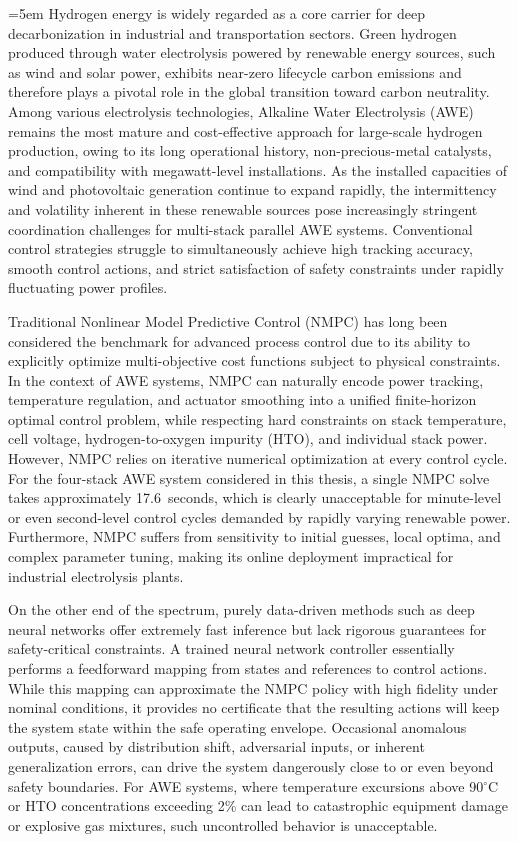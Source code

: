 
\begin{digest}[en]
\sloppy\emergencystretch=5em
Hydrogen energy is widely regarded as a core carrier for deep decarbonization in industrial and transportation sectors. Green hydrogen produced through water electrolysis powered by renewable energy sources, such as wind and solar power, exhibits near-zero lifecycle carbon emissions and therefore plays a pivotal role in the global transition toward carbon neutrality. Among various electrolysis technologies, Alkaline Water Electrolysis (AWE) remains the most mature and cost-effective approach for large-scale hydrogen production, owing to its long operational history, non-precious-metal catalysts, and compatibility with megawatt-level installations. As the installed capacities of wind and photovoltaic generation continue to expand rapidly, the intermittency and volatility inherent in these renewable sources pose increasingly stringent coordination challenges for multi-stack parallel AWE systems. Conventional control strategies struggle to simultaneously achieve high tracking accuracy, smooth control actions, and strict satisfaction of safety constraints under rapidly fluctuating power profiles.

Traditional Nonlinear Model Predictive Control (NMPC) has long been considered the benchmark for advanced process control due to its ability to explicitly optimize multi-objective cost functions subject to physical constraints. In the context of AWE systems, NMPC can naturally encode power tracking, temperature regulation, and actuator smoothing into a unified finite-horizon optimal control problem, while respecting hard constraints on stack temperature, cell voltage, hydrogen-to-oxygen impurity (HTO), and individual stack power. However, NMPC relies on iterative numerical optimization at every control cycle. For the four-stack AWE system considered in this thesis, a single NMPC solve takes approximately 17.6~seconds, which is clearly unacceptable for minute-level or even second-level control cycles demanded by rapidly varying renewable power. Furthermore, NMPC suffers from sensitivity to initial guesses, local optima, and complex parameter tuning, making its online deployment impractical for industrial electrolysis plants.

On the other end of the spectrum, purely data-driven methods such as deep neural networks offer extremely fast inference but lack rigorous guarantees for safety-critical constraints. A trained neural network controller essentially performs a feedforward mapping from states and references to control actions. While this mapping can approximate the NMPC policy with high fidelity under nominal conditions, it provides no certificate that the resulting actions will keep the system state within the safe operating envelope. Occasional anomalous outputs, caused by distribution shift, adversarial inputs, or inherent generalization errors, can drive the system dangerously close to or even beyond safety boundaries. For AWE systems, where temperature excursions above 90$^\circ$C or HTO concentrations exceeding 2\% can lead to catastrophic equipment damage or explosive gas mixtures, such uncontrolled behavior is unacceptable.


\end{digest}
